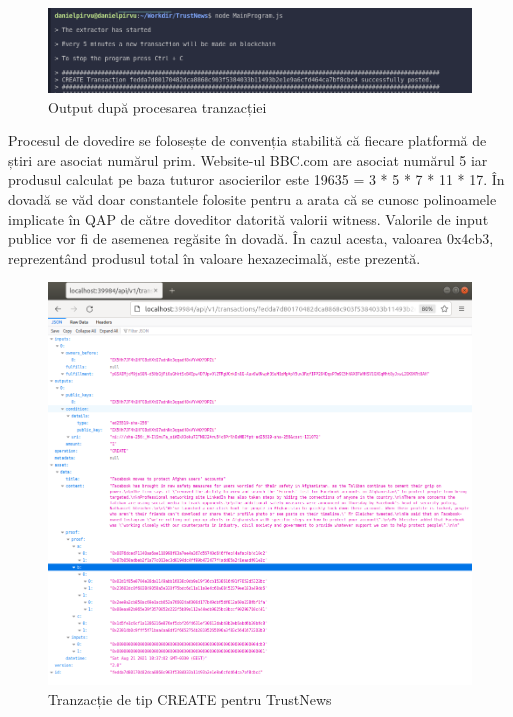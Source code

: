 \begin{figure}[H] 
\centering
\includegraphics[scale=0.5]{Images/SCR3.png}
\caption{Output după procesarea tranzacției}
\end{figure} 

Procesul de dovedire se folosește de convenția stabilită că fiecare platformă de știri are asociat numărul prim. Website-ul BBC.com are asociat numărul 5 iar produsul calculat pe baza tuturor asocierilor este 19635 = 3 * 5 * 7 * 11 * 17. În dovadă se văd doar constantele folosite pentru a arata că se cunosc polinoamele implicate în QAP de către doveditor datorită valorii witness. Valorile de input publice vor fi de asemenea regăsite în dovadă. În cazul acesta, valoarea 0x4cb3, reprezentând produsul total în valoare hexazecimală, este prezentă.\\

\begin{figure}[H] 
\centering
\includegraphics[scale=0.65]{Images/TN_Full_Create.png}
\caption{Tranzacție de tip CREATE pentru TrustNews}
\end{figure}

